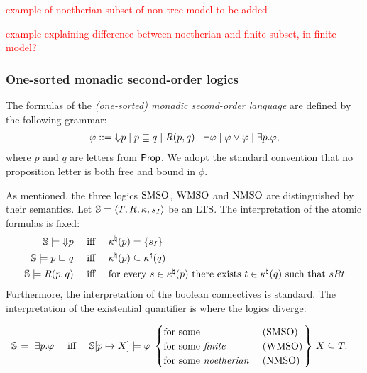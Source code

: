 \btbs
\item \textcolor{red}{example of noetherian subset of non-tree model to be added}
\item \textcolor{red}{example explaining difference between noetherian and 
finite subset, in finite model?}
\etbs

\subsubsection*{One-sorted monadic second-order logics}
%
\begin{definition}\label{def:mso}
The formulas of the \emph{(one-sorted) monadic second-order language} are
defined by the following grammar:
%
\begin{eqnarray*}\label{EQ_mso}
  \phi \isbnf  \here{p} \mid p \inc q \mid R(p,q) \mid \lnot\phi 
     \mid \phi\lor\phi \mid \exists p.\phi,
\end{eqnarray*}
where $p$ and $q$ are letters from $\mathsf{Prop}$.
We  adopt the standard convention that no proposition letter is both free and
bound in $\phi$.
\end{definition}


As mentioned, the three logics $\mathrm{SMSO}$, $\mathrm{WMSO}$ and $\mathrm{NMSO}$ are distinguished by
their semantics. 
Let  $\mathbb{S} = \langle{T,R,\kappa, s_I}\rangle$ be an LTS.
The interpretation of the atomic formulas is fixed:
\begin{align*}
\bbS \models \here{p} & \quad\text{ iff }\quad  \tsval(p) = \{s_I\} \\
\bbS \models p \inc q & \quad\text{ iff }\quad  \tsval(p) \subseteq \tsval(q) \\
\bbS \models R(p,q) & \quad\text{ iff }\quad  \text{for every $s\in \tsval(p)$ there exists $t\in \tsval(q)$ such that $sRt$} 
\end{align*}
Furthermore, the interpretation of the boolean connectives is standard.
The interpretation of the existential quantifier is where the logics diverge:

\begin{align*}
\bbS \models\ \exists p. \phi  & \quad\text{ iff }\quad  \bbS[p \mapsto X] \models \phi \,
\left.\begin{cases}
   \text{for some }                   & (\smso)
\\ \text{for some \emph{finite} }     & (\wmso) 
\\ \text{for some \emph{noetherian} } & (\nmso)
\end{cases}\right\}\,
 X \subseteq T.
\end{align*}

